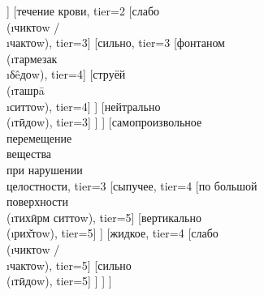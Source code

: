 \begin{sidewaysfigure}
\begin{forest}
		      [начинаться\\(\i{анҷафцтоw}), tier=5]
		      [нейтрально\\(\i{δêдоw}), tier=5]
		]
		[течение крови, tier=2
		      [слабо\\(\i{чиктоw} /\\\i{чактоw}), tier=3]
		      [сильно, tier=3
		          [фонтаном\\(\i{тармезак}\\\i{δêдоw}), tier=4]
    		      [струёй\\(\i{ташрā}\\\i{ситтоw}), tier=4]
		      ]
		      [нейтрально\\(\i{тӣдоw}), tier=3]
		]
	  ]
        [самопроизвольное\\перемещение\\вещества\\при нарушении\\целостности, tier=3
	    [сыпучее, tier=4
		      [по большой\\поверхности\\(\i{тихӣрм ситтоw}), tier=5]
    		  [вертикально\\(\i{рих̌тоw}), tier=5]
		]
		[жидкое, tier=4
		      [слабо\\(\i{чиктоw} /\\\i{чактоw}), tier=5]
		      [сильно\\(\i{тӣдоw}), tier=5]
		]
	  ]
    ]
\end{forest}

\end{sidewaysfigure}